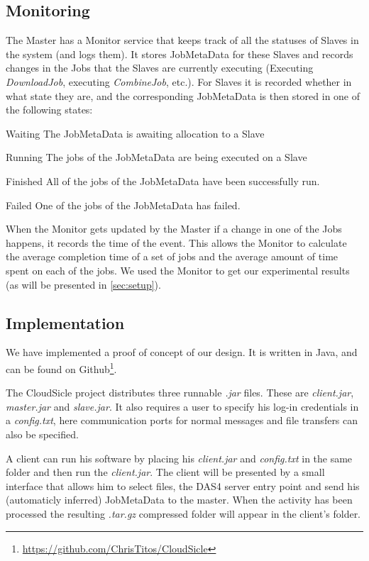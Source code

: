 \documentclass[twocolumn,twoside]{IEEEtran}
\begin{document}
\subsection{Monitoring}
The Master has a Monitor service that keeps track of all the statuses of Slaves in the system (and logs them).
It stores JobMetaData for these Slaves and records changes in the Jobs that the Slaves
are currently executing (Executing \emph{DownloadJob}, executing \emph{CombineJob}, etc.). 
For Slaves it is recorded whether in what state they are, and the corresponding JobMetaData
is then stored in one of the following states:
\begin{LaTeXdescription}
\item[Waiting] The JobMetaData is awaiting allocation to a Slave
\item[Running] The jobs of the JobMetaData are being executed on a Slave
\item[Finished] All of the jobs of the JobMetaData have been successfully run.
\item[Failed] One of the jobs of the JobMetaData has failed.
\end{LaTeXdescription}
When the Monitor gets updated by the Master if a change in one of the Jobs happens,
it records the time of the event. This allows the Monitor to calculate the
average completion time of a set of jobs and the average amount of time spent
on each of the jobs.
We used the Monitor to get our experimental results (as will be presented in \autoref{sec:setup}).

\subsection{Implementation}
We have implemented a proof of concept of our design. It is written in Java, and can be found on Github\footnote{\url{https://github.com/ChrisTitos/CloudSicle}}.

The CloudSicle project distributes three runnable \emph{.jar} files.
These are \emph{client.jar}, \emph{master.jar} and \emph{slave.jar}.
It also requires a user to specify his log-in credentials in a \emph{config.txt},
here communication ports for normal messages and file transfers can also
be specified.

A client can run his software by placing his \emph{client.jar} and \emph{config.txt}
in the same folder and then run the \emph{client.jar}. The client will
be presented by a small interface that allows him to select files, the DAS4
server entry point and send his (automaticly inferred) JobMetaData to the master.
When the activity has been processed the resulting \emph{.tar.gz} compressed
folder will appear in the client's folder.
\end{document}
